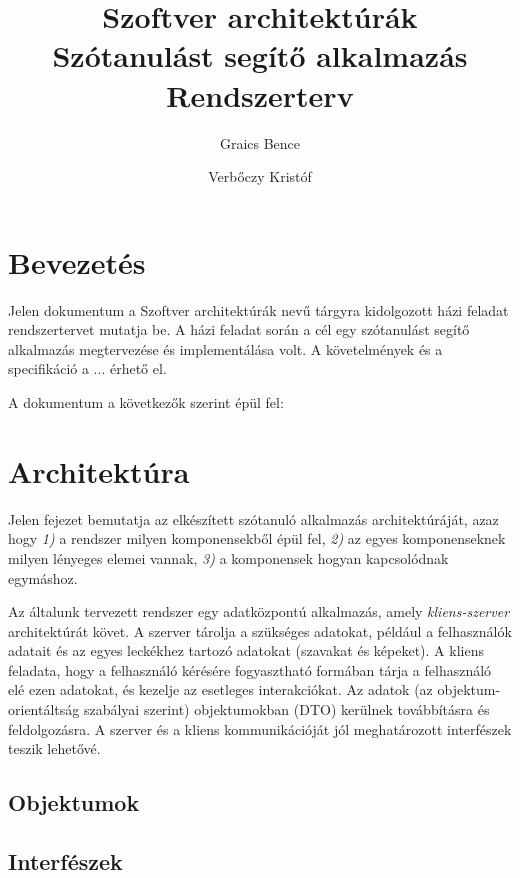 \documentclass[11pt, a4paper]{article}
\begin{document}
\title{Szoftver architektúrák \\ Szótanulást segítő alkalmazás \\ \large{Rendszerterv}}
    \author{Graics Bence \and Verbőczy Kristóf}

    \maketitle
    
    \tableofcontents
    \newpage
    
    \section{Bevezetés}
    \label{sec:bevezetes}
    Jelen dokumentum a Szoftver architektúrák nevű tárgyra kidolgozott házi feladat rendszertervet mutatja be. A házi feladat során a cél egy szótanulást segítő alkalmazás megtervezése és implementálása volt. A követelmények és a specifikáció a ... érhető el.
    
    A dokumentum a következők szerint épül fel:
    
    \section{Architektúra}
    \label{sec:architektúra}
    Jelen fejezet bemutatja az elkészített szótanuló alkalmazás architektúráját, azaz hogy \textit{1)} a rendszer milyen komponensekből épül fel, \textit{2)} az egyes komponenseknek milyen lényeges elemei vannak, \textit{3)} a komponensek hogyan kapcsolódnak egymáshoz.
    
    Az általunk tervezett rendszer egy adatközpontú alkalmazás, amely \emph{kliens-szerver} architektúrát követ. A szerver tárolja a szükséges adatokat, például a felhasználók adatait és az egyes leckékhez tartozó adatokat (szavakat és képeket). A kliens feladata, hogy a felhasználó kérésére fogyasztható formában tárja a felhasználó elé ezen adatokat, és kezelje az esetleges interakciókat. Az adatok (az objektum-orientáltság szabályai szerint) objektumokban (DTO) kerülnek továbbításra és feldolgozásra. A szerver és a kliens kommunikációját jól meghatározott interfészek teszik lehetővé.
    
    \subsection{Objektumok}
    
    \subsection{Interfészek}
    \label{sec:interfészek}
    
\end{document}
